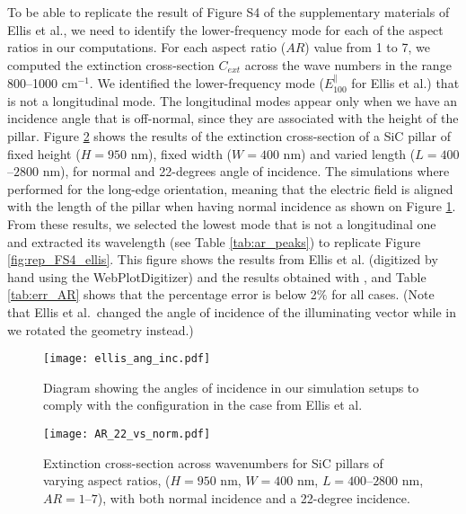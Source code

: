 To be able to replicate the result of Figure S4 of the supplementary materials of Ellis et al., we
need to identify the lower-frequency mode for each of
the aspect ratios in our computations. For each aspect ratio ($AR$) 
value from 1 to 7, we computed the extinction cross-section $C_{ext}$ across the wave numbers in the range
800--1000 cm$^{-1}$. We identified the lower-frequency mode ($E^{\parallel}_{100}$ for Ellis et al.) that is not a 
longitudinal mode. The longitudinal modes appear only when we have an incidence angle that is off-normal, since 
they are associated with the height of the pillar. Figure \ref{fig:AR_22_vs_norm} shows the results of the extinction 
cross-section of a SiC pillar of fixed height ($H=950$ nm), fixed width ($W=400$ nm) and varied length ($L=400$--$2800$ nm), for normal 
and 22-degrees angle of incidence. The simulations where performed 
for the long-edge orientation, meaning that the electric field is aligned with the length of the pillar 
when having normal incidence as shown on Figure \ref{fig:ellis_ang_inc}. From these results, we selected 
the lowest mode that is not a longitudinal one and extracted its wavelength (see Table \ref{tab:ar_peaks}) to replicate 
Figure \ref{fig:rep_FS4_ellis}. This figure shows the results from  Ellis et al. (digitized by hand using the WebPlotDigitizer) and the results obtained
with \pygbe, and Table \ref{tab:err_AR} shows that the percentage error is below 2$\%$ for all cases.
(Note that Ellis et al.\ changed the angle of incidence of the illuminating vector while in \pygbe we 
rotated the geometry instead.) 

\begin{figure}
    \centering
    \texttt{[image: ellis\_ang\_inc.pdf]} 
    \caption{Diagram showing the angles of incidence in our simulation setups to comply with the configuration in the case from Ellis et al.}
    \label{fig:ellis_ang_inc}
 \end{figure}


\begin{figure}
    \centering
    \texttt{[image: AR\_22\_vs\_norm.pdf]} 
    \caption{Extinction cross-section across wavenumbers for SiC pillars of varying aspect ratios,  
             ($H=950$ nm, $W=400$ nm, $L=400$--$2800$ nm, $AR=1$--$7$), with both normal incidence and a 
             22-degree incidence.
            }
    \label{fig:AR_22_vs_norm}
 \end{figure}


